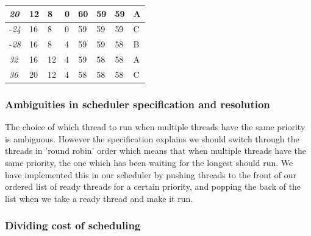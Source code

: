 \documentclass{article}
\renewcommand{\_}{\char`_}
\begin{document}
\begin{table}[]
\begin{tabular}{|l|l|l|l|l|l|l|l|}
\textit{20}                                                                      & 12           & 8            & 0           & 60          & 59          & 59         & A                                                                                 \\ \hline	 
-\textit{24}                                                                      & 16           & 8            & 0           & 59          & 59          & 59         & C                                                                                 \\ \hline 
-\textit{28}                                                                      & 16           & 8            & 4           & 59          & 59          & 58         & B                                                                                 \\ \hline	 
\textit{32}                                                                      & 16           & 12           & 4           & 59          & 58          & 58         & A                                                                                 \\ \hline 
\textit{36}                                                                      & 20           & 12           & 4           & 58          & 58          & 58         & C                                                                                 \\ \hline 
\end{tabular}	 
\end{table}


\subsubsection{Ambiguities in scheduler specification and resolution}

The choice of which thread to run when multiple threads have the same priority is ambiguous. However the specification explains we should switch through the threads in 'round robin' order which means that when multiple threads have the same priority, the one which has been waiting for the longest should run. We have implemented this in our scheduler by pushing threads to the front of our ordered list of ready threads for a certain priority, and popping the back of the list when we take a ready thread and make it run. 

\subsubsection{Dividing cost of scheduling}
\end{document}
